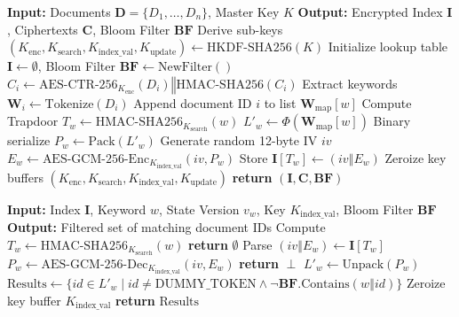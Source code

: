 \documentclass[runningheads]{llncs}
\begin{document}
\begin{algorithm}[t]
\caption{VisioCrypt Index Construction ($\text{BuildIndex}$)}\label{alg:buildindex}
\begin{algorithmic}[1]
\Statex \textbf{Input:} Documents $\mathbf{D} = \{D_1, \dots, D_n\}$, Master Key $K$
\Statex \textbf{Output:} Encrypted Index $\mathbf{I}$, Ciphertexts $\mathbf{C}$, Bloom Filter $\mathbf{BF}$
\State Derive sub-keys $(K_{\text{enc}}, K_{\text{search}}, K_{\text{index\_val}}, K_{\text{update}}) \leftarrow \text{HKDF-SHA256}(K)$
\State Initialize lookup table $\mathbf{I} \leftarrow \emptyset$, Bloom Filter $\mathbf{BF} \leftarrow \text{NewFilter}()$
    \State $C_i \leftarrow \text{AES-CTR-256}_{K_{\text{enc}}}(D_i) \mathbin{\Vert} \text{HMAC-SHA256}(C_i)$
    \State Extract keywords $\mathbf{W}_i \leftarrow \text{Tokenize}(D_i)$
        \State Append document ID $i$ to list $\mathbf{W}_{\text{map}}[w]$
    \EndFor
\EndFor
{}
    \State Compute Trapdoor $T_w \leftarrow \text{HMAC-SHA256}_{K_{\text{search}}}(w)$
    \State $L'_w \leftarrow \Phi(\mathbf{W}_{\text{map}}[w])$ 
    \State Binary serialize $P_w \leftarrow \text{Pack}(L'_w)$
    \State Generate random 12-byte IV $iv$
    \State $E_w \leftarrow \text{AES-GCM-256-Enc}_{K_{\text{index\_val}}}(iv, P_w)$
    \State Store $\mathbf{I}[T_w] \leftarrow (iv \mathbin{\Vert} E_w)$
\EndFor
\State Zeroize key buffers $(K_{\text{enc}}, K_{\text{search}}, K_{\text{index\_val}}, K_{\text{update}})$
\State \textbf{return} $(\mathbf{I}, \mathbf{C}, \mathbf{BF})$
\end{algorithmic}
\end{algorithm}

\begin{algorithm}[t]
\caption{VisioCrypt Search Query Resolution ($\text{Search}$)}\label{alg:search}
\begin{algorithmic}[1]
\Statex \textbf{Input:} Index $\mathbf{I}$, Keyword $w$, State Version $v_w$, Key $K_{\text{index\_val}}$, Bloom Filter $\mathbf{BF}$
\Statex \textbf{Output:} Filtered set of matching document IDs
\State Compute $T_w \leftarrow \text{HMAC-SHA256}_{K_{\text{search}}}(w)$
    \State \textbf{return} $\emptyset$
\EndIf
\State Parse $(iv \mathbin{\Vert} E_w) \leftarrow \mathbf{I}[T_w]$
\State $P_w \leftarrow \text{AES-GCM-256-Dec}_{K_{\text{index\_val}}}(iv, E_w)$
 \State \textbf{return} $\perp$ \EndIf
\State $L'_w \leftarrow \text{Unpack}(P_w)$
\State $\text{Results} \leftarrow \{ id \in L'_w \mid id \neq \text{DUMMY\_TOKEN} \land \neg \mathbf{BF}.\text{Contains}(w \mathbin{\Vert} id) \}$
\State Zeroize key buffer $K_{\text{index\_val}}$
\State \textbf{return} $\text{Results}$
\end{algorithmic}
\end{algorithm}
\end{document}
